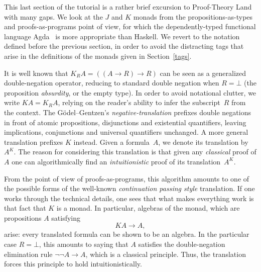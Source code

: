 
This last section of the tutorial is a rather brief excursion to
Proof-Theory Land with many gaps. We look at the $J$ and $K$ monads
from the propositions-as-types and proofs-as-programs point of view,
for which the dependently-typed functional language
Agda~\cite{bove:dybjer} is more appropriate than Haskell. We revert to
the notation defined before the previous section, in order to avoid
the distracting tags that arise in the definitions of the monads given
in Section~\ref{tags}.


It is well known that $K_R A = ((A \to R) \to R)$ can be seen as a
generalized double-negation operator, reducing to standard double
negation when $R=\bot$ (the proposition \emph{absurdity}, or the empty
type). In order to avoid notational clutter, we write $K A = K_R A$,
relying on the reader's ability to infer the subscript~$R$ from the
context. The G\"odel--Gentzen's \emph{negative-translation} prefixes
double negations in front of atomic propositions, disjunctions and
existential quantifiers, leaving implications, conjunctions and
universal quantifiers unchanged.  A more general translation prefixes
$K$ instead. Given a formula~$A$, we denote its translation by
$A^{K}$.  The reason for considering this translation is that given
any \emph{classical} proof of $A$ one can algorithmically find an
\emph{intuitionistic} proof of its translation~$A^{K}$.


From the point of view of proofs-as-programs, this algorithm amounts
to one of the possible forms of the well-known \emph{continuation
  passing style} translation. If one works through the technical
details, one sees that what makes everything work is that fact that
$K$ is a monad. In particular, algebras of the monad, which are
propositions $A$ satisfying
\[
K A \to A,
\]
arise: every translated formula can be shown to be an algebra. In the
particular case $R=\bot$, this amounts to saying that $A$ satisfies
the double-negation elimination rule $\neg \neg A \to A$, which is a
classical principle. Thus, the translation forces this principle to
hold intuitionistically.

